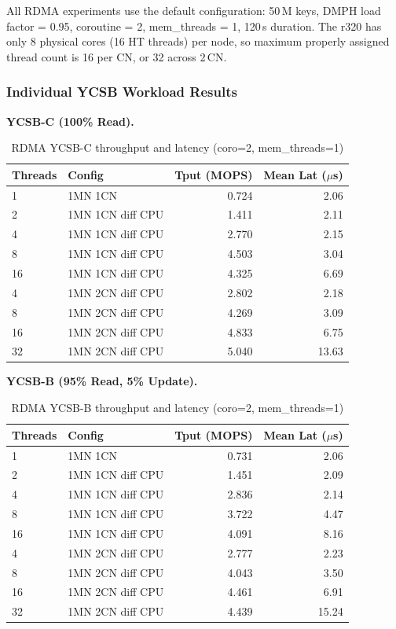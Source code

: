 \documentclass[conference]{IEEEtran}
\begin{document}
All RDMA experiments use the default configuration: 50\,M keys, DMPH load factor = 0.95, coroutine = 2, mem\_threads = 1, 120\,s duration. The r320 has only 8 physical cores (16 HT threads) per node, so maximum properly assigned thread count is 16 per CN, or 32 across 2\,CN.

\subsubsection{Individual YCSB Workload Results}

\textbf{YCSB-C (100\% Read).}

\begin{table}[H]
\caption{RDMA YCSB-C throughput and latency (coro=2, mem\_threads=1)}
\label{tab:rdma-ycsbc}
\small
\begin{tabular}{@{}llrr@{}}
\toprule
\textbf{Threads} & \textbf{Config} & \textbf{Tput (MOPS)} & \textbf{Mean Lat ($\mu$s)} \\
\midrule
1  & 1MN 1CN             & 0.724 & 2.06 \\
2  & 1MN 1CN diff CPU    & 1.411 & 2.11 \\
4  & 1MN 1CN diff CPU    & 2.770 & 2.15 \\
8  & 1MN 1CN diff CPU    & 4.503 & 3.04 \\
16 & 1MN 1CN diff CPU    & 4.325 & 6.69 \\
\midrule
4  & 1MN 2CN diff CPU    & 2.802 & 2.18 \\
8  & 1MN 2CN diff CPU    & 4.269 & 3.09 \\
16 & 1MN 2CN diff CPU    & 4.833 & 6.75 \\
32 & 1MN 2CN diff CPU    & 5.040 & 13.63 \\
\bottomrule
\end{tabular}
\end{table}

\textbf{YCSB-B (95\% Read, 5\% Update).}

\begin{table}[H]
\centering
\caption{RDMA YCSB-B throughput and latency (coro=2, mem\_threads=1)}
\label{tab:rdma-ycsbb}
\small
\begin{tabular}{@{}llrr@{}}
\toprule
\textbf{Threads} & \textbf{Config} & \textbf{Tput (MOPS)} & \textbf{Mean Lat ($\mu$s)} \\
\midrule
1  & 1MN 1CN             & 0.731 & 2.06 \\
2  & 1MN 1CN diff CPU    & 1.451 & 2.09 \\
4  & 1MN 1CN diff CPU    & 2.836 & 2.14 \\
8  & 1MN 1CN diff CPU    & 3.722 & 4.47 \\
16 & 1MN 1CN diff CPU    & 4.091 & 8.16 \\
\midrule
4  & 1MN 2CN diff CPU    & 2.777 & 2.23 \\
8  & 1MN 2CN diff CPU    & 4.043 & 3.50 \\
16 & 1MN 2CN diff CPU    & 4.461 & 6.91 \\
32 & 1MN 2CN diff CPU    & 4.439 & 15.24 \\
\bottomrule
\end{tabular}
\end{table}
\end{document}
